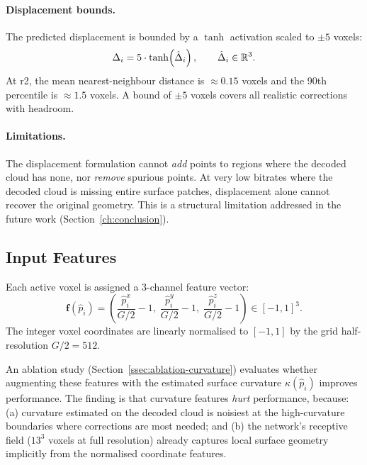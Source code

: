 \paragraph{Displacement bounds.}
The predicted displacement is bounded by a $\tanh$ activation scaled to $\pm5$
voxels:
\begin{equation}
  \Delta_i = 5 \cdot \tanh\!\left(\hat{\Delta}_i\right), \qquad \hat{\Delta}_i \in \mathbb{R}^3.
\end{equation}
At r2, the mean nearest-neighbour distance is $\approx 0.15$ voxels and the
90th percentile is $\approx 1.5$ voxels.
A bound of $\pm5$ voxels covers all realistic corrections with headroom.

\paragraph{Limitations.}
The displacement formulation cannot \emph{add} points to regions where the
decoded cloud has none, nor \emph{remove} spurious points.
At very low bitrates where the decoded cloud is missing entire surface patches,
displacement alone cannot recover the original geometry.
This is a structural limitation addressed in the future work
(Section~\ref{ch:conclusion}).

\subsection{Input Features}

Each active voxel is assigned a 3-channel feature vector:
\begin{equation}
  \mathbf{f}(\hat{p}_i) = \left(\frac{\hat{p}_i^x}{G/2} - 1,\;
    \frac{\hat{p}_i^y}{G/2} - 1,\;
    \frac{\hat{p}_i^z}{G/2} - 1\right) \in [-1, 1]^3.
\end{equation}
The integer voxel coordinates are linearly normalised to $[-1, 1]$ by the
grid half-resolution $G/2 = 512$.

An ablation study (Section~\ref{ssec:ablation-curvature}) evaluates whether
augmenting these features with the estimated surface curvature $\kappa(\hat{p}_i)$
improves performance.
The finding is that curvature features \emph{hurt} performance, because:
(a) curvature estimated on the decoded cloud is noisiest at the high-curvature
boundaries where corrections are most needed; and
(b) the network's receptive field ($13^3$ voxels at full resolution) already
captures local surface geometry implicitly from the normalised coordinate
features.

